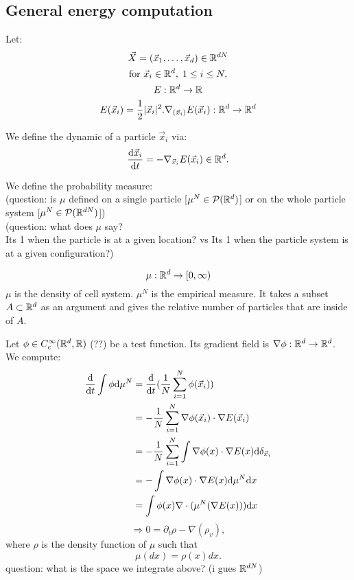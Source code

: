 \subsection{General energy computation}

Let:
\begin{gather*}
    \vec{X} = (\vec{x}_1, \ldots, \vec{x}_d) \in \mathbb{R}^{dN} \\
    \text{for } \vec{x}_i \in \mathbb{R}^d, \; 1 \leq i \leq N, \\
    E: \mathbb{R}^d \rightarrow \mathbb{R} \\ 
    E(\vec{x}_i) = \frac{1}{2} |\vec{x}_i|^2.
    \nabla_{(\vec{x}_i)} E(\vec{x}_i): \mathbb{R}^d \rightarrow \mathbb{R}^d
\end{gather*}

We define the dynamic of a particle $\vec{x}_i$ via: \\
\[ \dfrac{\mathrm{d} \vec{x}_i}{\mathrm{d} t} = - \nabla_{\vec{x}_i} E(\vec{x}_i) \in \mathbb{R}^{d}. \]

We define the probability measure:\\
(question: is $\mu$ defined on a single particle [$\mu^{N} \in \mathcal{P}(\mathbb{R}^d)$] or on the whole particle system [$\mu^{N} \in \mathcal{P}(\mathbb{R}^{dN})$]) \\
(question: what does $\mu$ say? \\
Its 1 when the particle is at a given location? vs Its 1 when the particle system is at a given configuration?)

\[ \mu: \mathbb{R}^d \rightarrow [0,\infty)  \]
$\mu$ is the density of cell system.
$\mu^N$ is the empirical measure. 
It takes a subset $A \subset \mathbb{R}^d$ as an argument and gives the relative number of particles that are inside of $A$. 

Let $\phi \in C_c^{\infty}(\mathbb{R}^{d}, \mathbb{R})$ (??) be a test function. 
Its gradient field is $ \nabla \phi : \mathbb{R}^d \rightarrow \mathbb{R}^d$. 
We compute: 
\begin{align*}
    \frac{\mathrm{d}}{\mathrm{d} t} \int \phi \mathrm{d} \mu^N 
    &= \frac{\mathrm{d}}{\mathrm{d} t} (\frac{1}{N} \sum\limits_{i=1}^{N} \phi(\vec{x}_i)) \\
    &= - \frac{1}{N} \sum\limits_{i=1}^{N} \nabla \phi(\vec{x}_i) \cdot \nabla E(\vec{x}_i) \\
    &= - \frac{1}{N} \sum\limits_{i=1}^{N} \int \nabla \phi(x) \cdot \nabla E(x) \mathrm{d} \delta_{\vec{x}_i} \\
    &= - \int \nabla \phi(x) \cdot \nabla E(x) \mathrm{d} \mu^N \mathrm{d} x \\
    &= \int \phi(x)  \nabla \cdot ( \mu^N(\nabla E(x))) \mathrm{d} x \\
\end{align*}
\[ \Rightarrow  0 = \partial_t \rho - \nabla(\rho_v),\]
where $\rho$ is the density function of $\mu$ such that \[ \mu(dx) = \rho(x) dx. \]
question: what is the space we integrate above? (i gues $\mathbb{R}^{dN}$)